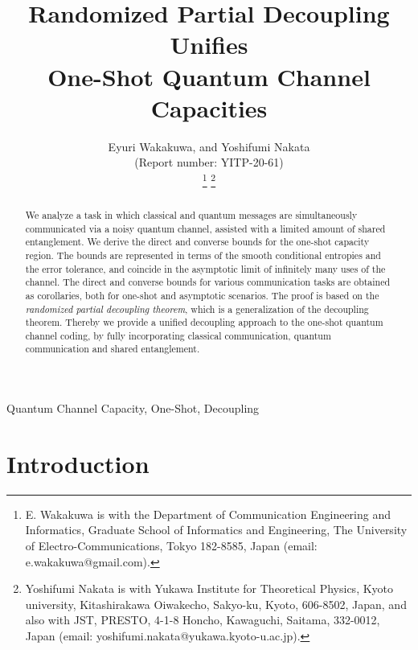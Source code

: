 \documentclass[journal]{IEEEtran}
\begin{document}
\title{Randomized Partial Decoupling Unifies\\ One-Shot Quantum Channel Capacities}

\author{Eyuri Wakakuwa, and Yoshifumi Nakata \\ (Report number: YITP-20-61)
 

\thanks{E. Wakakuwa is with the Department of Communication Engineering and Informatics, Graduate School of Informatics and Engineering, The University of Electro-Communications, Tokyo 182-8585, Japan (email: e.wakakuwa@gmail.com).}
\thanks{Yoshifumi Nakata is with Yukawa Institute for Theoretical Physics, Kyoto university, Kitashirakawa Oiwakecho, Sakyo-ku, Kyoto, 606-8502, Japan, and also with JST, PRESTO, 4-1-8 Honcho, Kawaguchi, Saitama, 332-0012, Japan (email: yoshifumi.nakata@yukawa.kyoto-u.ac.jp).}
}



\maketitle


\begin{abstract}
We analyze a task in which classical and quantum messages are simultaneously communicated via a noisy quantum channel, assisted with a limited amount of shared entanglement. 
We derive the direct and converse bounds for the one-shot capacity region.
The bounds are represented in terms of the smooth conditional entropies and the error tolerance, and coincide in the asymptotic limit of infinitely many uses of the channel.
The direct and converse bounds for various communication tasks are obtained as corollaries, both for one-shot and asymptotic scenarios.
The proof is based on the {\it randomized partial decoupling theorem}, which is a generalization of the decoupling theorem.
Thereby we provide a unified decoupling approach to the one-shot quantum channel coding, by fully incorporating classical communication, quantum communication and shared entanglement.
\end{abstract}


\begin{IEEEkeywords}
Quantum Channel Capacity, One-Shot, Decoupling
\end{IEEEkeywords}


\section{Introduction}
\end{document}
